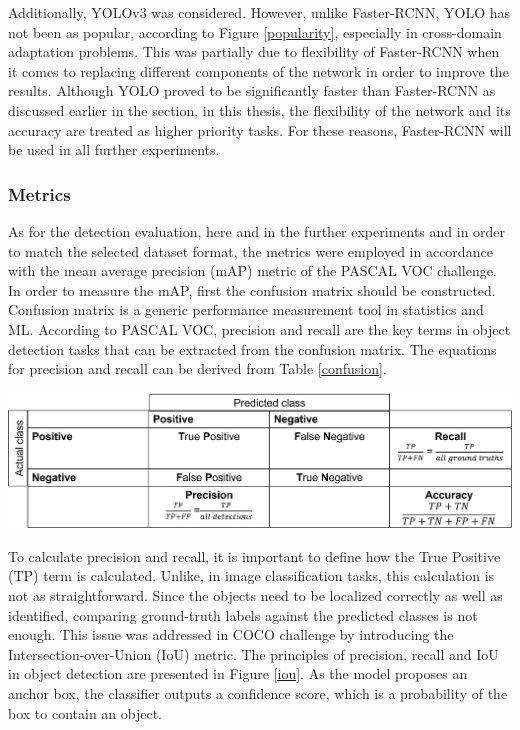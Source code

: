 Additionally, YOLOv3 \cite{Redmon2018a} was considered. However, unlike Faster-RCNN, YOLO has not been as popular, according to Figure \ref{popularity}, especially in cross-domain adaptation problems. This was partially due to flexibility of Faster-RCNN when it comes to replacing different components of the network in order to improve the results. Although YOLO proved to be significantly faster than Faster-RCNN as discussed earlier in the  section, in this thesis, the flexibility of the network and its accuracy are treated  as higher priority tasks. For these reasons, Faster-RCNN will be used in all further experiments.  
   

\subsubsection{Metrics}
\label{metrics_section} 

As for the detection evaluation, here and in the further experiments and in order to match the selected dataset format, the metrics were employed in accordance with the mean average precision (mAP) metric of the PASCAL VOC \cite{Everingham10} challenge. In order to measure the mAP, first the confusion matrix should be constructed. Confusion matrix is a generic performance measurement tool in statistics and ML. According to PASCAL VOC, precision and recall are the key terms in object detection tasks that can be extracted from the confusion matrix. The equations for precision and recall can be derived from Table \ref{confusion}.

\begin{table}[htb]
	\begin{center}
		\includegraphics[width=14cm]{./confusion.png}
	\end{center}
	\begin{center}
		\label{confusion}
	\end{center}
\end{table}

To calculate precision and recall, it is important to define how the True Positive (TP) term is calculated. Unlike, in image classification tasks, this calculation is not as straightforward. Since the objects need to be localized correctly as well as identified, comparing ground-truth labels against the predicted classes is not enough. This issue was addressed in COCO challenge \cite{Lin2014} by introducing the Intersection-over-Union (IoU) metric. The principles of precision, recall and IoU in object detection are presented in Figure \ref{iou}. As the model proposes an anchor box, the classifier outputs a confidence score, which is a probability of the box to contain an object. 

